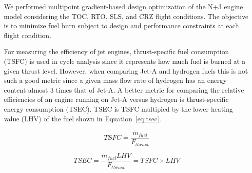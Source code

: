 \documentclass[conf]{new-aiaa}
\begin{document}
We performed multipoint gradient-based design optimization of the N+3 engine model considering the TOC, RTO, SLS, and CRZ flight conditions.
The objective is to minimize fuel burn subject to design and performance constraints at each flight condition.

For measuring the efficiency of jet engines, thrust-specific fuel consumption (TSFC) is used in cycle analysis since it represents how much fuel is burned at a given thrust level.
However, when comparing Jet-A and hydrogen fuels this is not such a good metric since a given mass flow rate of hydrogen has an energy content almost 3 times that of Jet-A.
A better metric for comparing the relative efficiencies of an engine running on Jet-A versus hydrogen is thrust-specific energy consumption (TSEC). %
TSEC is TSFC multipied by the lower heating value (LHV) of the fuel shown in Equation~\eqref{eq:tsec}.

\begin{equation}
    TSFC = \frac{\Dot{m}_{fuel}}{F_{thrust}}
    \label{eq:tsfc}
\end{equation}

\begin{equation}
    TSEC = \frac{\Dot{m}_{fuel} LHV}{F_{thrust}} = TSFC \times LHV
    \label{eq:tsec}
\end{equation}
\end{document}
